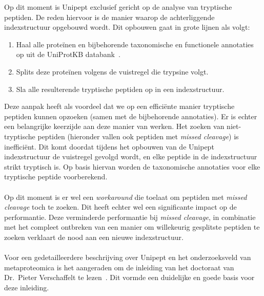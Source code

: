 Op dit moment is Unipept exclusief gericht op de analyse van tryptische peptiden.
De reden hiervoor is de manier waarop de achterliggende indexstructuur opgebouwd wordt.
Dit opbouwen gaat in grote lijnen als volgt:

\begin{enumerate}
    \item Haal alle proteïnen en bijbehorende taxonomische en functionele annotaties op uit de UniProtKB databank~\cite{UniprotKB}.
    \item Splits deze proteïnen volgens de vuistregel die trypsine volgt.
    \item Sla alle resulterende tryptische peptiden op in een indexstructuur.
\end{enumerate}

Deze aanpak heeft als voordeel dat we op een efficiënte manier tryptische peptiden kunnen opzoeken (samen met de bijbehorende annotaties).
Er is echter een belangrijke keerzijde aan deze manier van werken.
Het zoeken van niet-tryptische peptiden (hieronder vallen ook peptiden met \textit{missed cleavage}) is inefficiënt.
Dit komt doordat tijdens het opbouwen van de Unipept indexstructuur de vuistregel gevolgd wordt, en elke peptide in de indexstructuur strikt tryptisch is.
Op basis hiervan worden de taxonomische annotaties voor elke tryptische peptide voorberekend.
\\ \\
Op dit moment is er wel een \textit{workaround} die toelaat om peptiden met \textit{missed cleavage} toch te zoeken.
Dit heeft echter wel een significante impact op de performantie.
Deze verminderde performantie bij \textit{missed cleavage}, in combinatie met het compleet ontbreken van een manier om willekeurig gesplitste peptiden te zoeken verklaart de nood aan een nieuwe indexstructuur.
\\ \\
Voor een gedetailleerdere beschrijving over Unipept en het onderzoeksveld van metaproteomica is het aangeraden om de inleiding van het doctoraat van Dr.~Pieter Verschaffelt te lezen~\cite{phdPieterUnipept}.
Dit vormde een duidelijke en goede basis voor deze inleiding.


